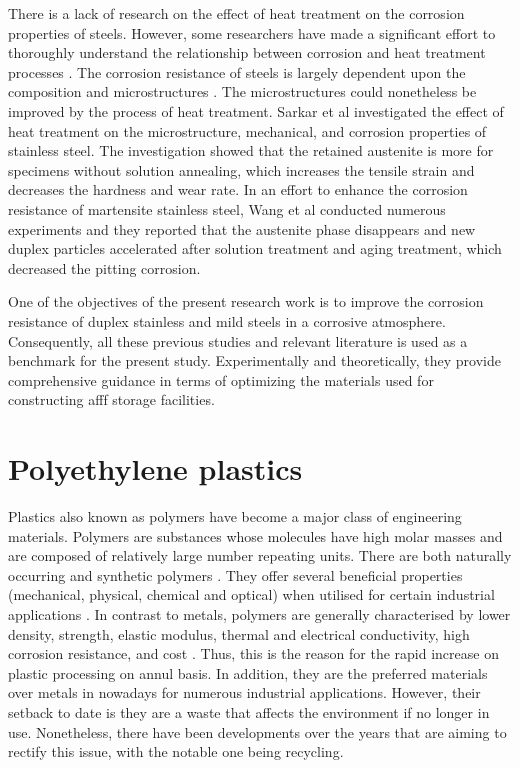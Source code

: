 There is a lack of research on the effect of heat treatment on the corrosion properties of steels. However, some researchers have made a significant effort to thoroughly understand the relationship between corrosion and heat treatment processes \cite{whitman1924effect, hackerman1987theory}. The corrosion resistance of steels is largely dependent upon the composition and microstructures \cite{wang2020enhancing}. The microstructures could nonetheless be improved by the process of heat treatment. Sarkar et al \cite{sarkar2020effects} investigated the effect of heat treatment on the microstructure, mechanical, and corrosion properties of stainless steel. The investigation showed that the retained austenite is more for specimens without solution annealing, which increases the tensile strain and decreases the hardness and wear rate. In an effort to enhance the corrosion resistance of martensite stainless steel, Wang et al \cite{wang2020enhancing} conducted numerous experiments and they reported that the austenite phase disappears and new duplex particles accelerated after solution treatment and aging treatment, which decreased the pitting corrosion. 

One of the objectives of the present research work is to improve the corrosion resistance of duplex stainless and mild steels in a corrosive atmosphere. Consequently, all these previous studies and relevant literature is used as a benchmark for the present study. Experimentally and theoretically, they provide comprehensive guidance in terms of optimizing the materials used for constructing \acrshort{afff} storage facilities.

\section{Polyethylene plastics}
Plastics also known as polymers have become a major class of engineering materials. Polymers are substances whose molecules have high molar masses and are composed of relatively large number repeating units. There are both naturally occurring and synthetic polymers \cite{roslan2013effect}. They offer several beneficial properties (mechanical, physical, chemical and optical) when utilised for certain industrial applications \cite{nugent2017rotational}. In contrast to metals, polymers are generally characterised by lower density, strength, elastic modulus, thermal and electrical conductivity, high corrosion resistance, and cost \cite{roslan2013effect}. Thus, this is the reason for the rapid increase on plastic processing on annul basis. In addition, they are the preferred materials over metals in nowadays for numerous industrial applications. However, their setback to date is they are a waste that affects the environment if no longer in use. Nonetheless, there have been developments over the years that are aiming to rectify this issue, with the notable one being recycling.  

